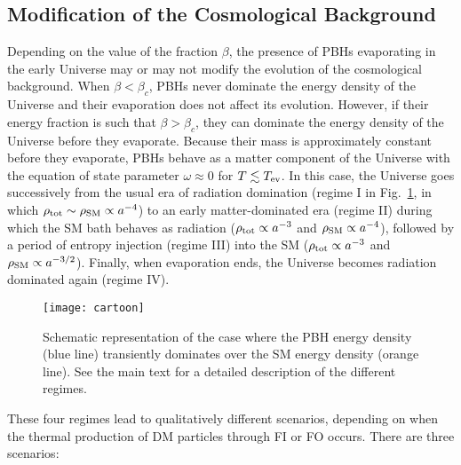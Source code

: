 \documentclass[aps,prd,reprint,twocolumn,preprintnumbers,floatfix,nofootinbib]{revtex4-1}
\begin{document}
\subsection{Modification of the Cosmological Background}\label{sec:modcos}
Depending on the value of the fraction $\beta$, the presence of PBHs evaporating in the early Universe may or may not modify the evolution of the cosmological background. When $\beta<\beta_c$, PBHs never dominate the energy density of the Universe and their evaporation does not affect its evolution. However, if their energy fraction is such that $\beta >\beta_c$, they can dominate the energy density of the Universe before they evaporate. Because their mass is approximately constant before they evaporate, PBHs behave as a matter component of the Universe with the equation of state parameter $\omega\approx 0$ for $T\lesssim T_{\rm ev}$. In this case, the Universe goes successively from the usual era of radiation domination (regime I in Fig.~\ref{fig:cartoon}, in which $\rho_{\rm tot}\sim \rho_{\rm SM} \propto a^{-4}$) to an early matter-dominated era (regime II) during which the SM bath behaves as radiation ($\rho_{\rm tot}\propto a^{-3}$ and $\rho_{\rm SM}\propto a^{-4}$), followed by a period of entropy injection (regime III) into the SM ($\rho_{\rm tot}\propto a^{-3}$ and $\rho_{\rm SM}\propto a^{-3/2}$). Finally, when evaporation ends, the Universe becomes radiation dominated again (regime IV). 
\begin{figure}
 \centering
 \texttt{[image: cartoon]}
 \caption{\label{fig:cartoon}\footnotesize Schematic representation of the case where the PBH energy density (blue line) transiently dominates over the SM energy density (orange line). See the main text for a detailed description of the different regimes.}
\end{figure}

These four regimes lead to qualitatively different scenarios, depending on when the thermal production of DM particles through FI or FO occurs. There are three scenarios:
\end{document}

